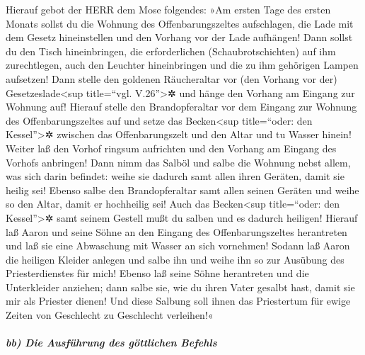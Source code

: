  Hierauf gebot der HERR dem Mose folgendes: 
»Am ersten Tage des ersten Monats sollst du die Wohnung des
Offenbarungszeltes aufschlagen,  die Lade mit dem Gesetz
hineinstellen und den Vorhang vor der Lade aufhängen! 
Dann sollst du den Tisch hineinbringen, die erforderlichen
(Schaubrotschichten) auf ihm zurechtlegen, auch den Leuchter
hineinbringen und die zu ihm gehörigen Lampen aufsetzen! 
Dann stelle den goldenen Räucheraltar vor (den Vorhang vor der)
Gesetzeslade\textless sup title=``vgl. V.26''\textgreater✲ und hänge den
Vorhang am Eingang zur Wohnung auf!  Hierauf stelle den
Brandopferaltar vor dem Eingang zur Wohnung des Offenbarungszeltes auf
 und setze das Becken\textless sup title=``oder: den
Kessel''\textgreater✲ zwischen das Offenbarungszelt und den Altar und tu
Wasser hinein!  Weiter laß den Vorhof ringsum aufrichten
und den Vorhang am Eingang des Vorhofs anbringen!  Dann
nimm das Salböl und salbe die Wohnung nebst allem, was sich darin
befindet: weihe sie dadurch samt allen ihren Geräten, damit sie heilig
sei!  Ebenso salbe den Brandopferaltar samt allen seinen
Geräten und weihe so den Altar, damit er hochheilig sei! 
Auch das Becken\textless sup title=``oder: den Kessel''\textgreater✲
samt seinem Gestell mußt du salben und es dadurch heiligen!
 Hierauf laß Aaron und seine Söhne an den Eingang des
Offenbarungszeltes herantreten und laß sie eine Abwaschung mit Wasser an
sich vornehmen!  Sodann laß Aaron die heiligen Kleider
anlegen und salbe ihn und weihe ihn so zur Ausübung des Priesterdienstes
für mich!  Ebenso laß seine Söhne herantreten und die
Unterkleider anziehen;  dann salbe sie, wie du ihren
Vater gesalbt hast, damit sie mir als Priester dienen! Und diese Salbung
soll ihnen das Priestertum für ewige Zeiten von Geschlecht zu Geschlecht
verleihen!«

\hypertarget{bb-die-ausfuxfchrung-des-guxf6ttlichen-befehls}{%
\subparagraph{bb) Die Ausführung des göttlichen
Befehls}\label{bb-die-ausfuxfchrung-des-guxf6ttlichen-befehls}}

